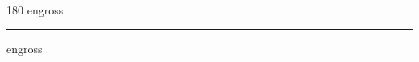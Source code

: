 
\begin{frame}
\begin{center}
\begin{turn}{180}
{\fontsize{2.5cm}{1em}\selectfont engross}
\end{turn}
\vspace{1em}\par  
\hrule
\vspace{1em}\par  
{\fontsize{2.5cm}{1em}\selectfont engross}
\end{center}
\end{frame}
